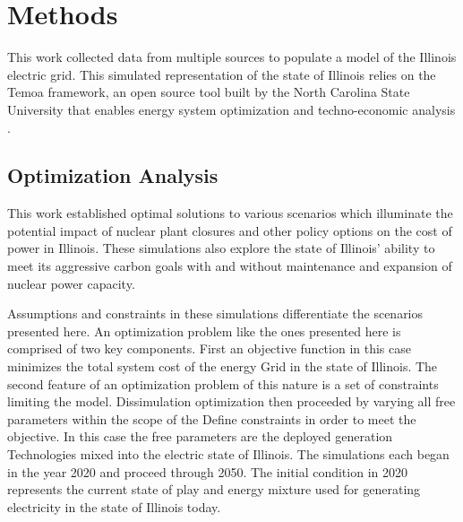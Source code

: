 \section{Methods}

This work collected data from multiple sources to populate a model of the 
Illinois electric grid. This simulated representation of the state of 
Illinois relies on the Temoa framework, an open source tool built by the North 
Carolina State University that enables energy system optimization and 
techno-economic analysis 
\cite{decarolis_temoa_2010,decarolis_modelling_2016,decarolis_formalizing_2017}.

\subsection{Optimization Analysis}
This work established optimal solutions to 
various scenarios which illuminate the potential impact of nuclear plant 
closures and other policy options on the cost of power in Illinois. These 
simulations  also explore the state of Illinois' ability to meet its aggressive 
carbon goals with and without maintenance and expansion of nuclear power 
capacity. 

Assumptions and constraints in these simulations differentiate the scenarios 
presented here. An optimization problem like the ones presented here is 
comprised of two key components. First an objective function in this case 
minimizes the total system cost of the energy Grid in the state of Illinois. 
The second feature of an optimization problem of this nature is a set of 
constraints limiting the model. Dissimulation optimization then proceeded by 
varying all free parameters within the scope of the Define constraints in order 
to meet the objective. In this case the free parameters are the deployed 
generation Technologies mixed into the electric state of Illinois. The 
simulations each began in the year 2020 and proceed through 2050. The initial 
condition in 2020 represents the current state of play and energy mixture used 
for generating electricity in the state of Illinois today.

